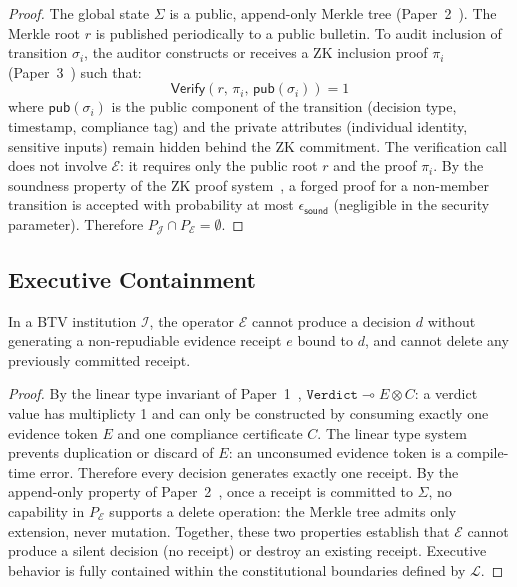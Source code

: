 \begin{proof}
The global state $\Sigma$ is a public, append-only Merkle tree
(Paper~2~\cite{btv-t-repo}). The Merkle root $r$ is published
periodically to a public bulletin. To audit inclusion of transition
$\sigma_i$, the auditor constructs or receives a ZK inclusion proof
$\pi_i$ (Paper~3~\cite{btv-ar2026}) such that:
\[
  \mathsf{Verify}(r,\, \pi_i,\, \mathsf{pub}(\sigma_i)) = 1
\]
where $\mathsf{pub}(\sigma_i)$ is the public component of the transition
(decision type, timestamp, compliance tag) and the private attributes
(individual identity, sensitive inputs) remain hidden behind the ZK
commitment. The verification call does not involve $\mathcal{E}$: it
requires only the public root $r$ and the proof $\pi_i$. By the
soundness property of the ZK proof system~\cite{btv-ar2026}, a forged
proof for a non-member transition is accepted with probability at most
$\epsilon_{\mathsf{sound}}$ (negligible in the security parameter).
Therefore $P_{\mathcal{J}} \cap P_{\mathcal{E}} = \emptyset$.
\end{proof}

\subsection{Executive Containment}
\label{subsec:exec-containment}

\begin{theorem}
\label{thm:exec}
In a BTV institution $\mathcal{I}$, the operator $\mathcal{E}$ cannot
produce a decision $d$ without generating a non-repudiable evidence
receipt $e$ bound to $d$, and cannot delete any previously committed
receipt.
\end{theorem}

\begin{proof}
By the linear type invariant of Paper~1~\cite{btv2026},
$\mathtt{Verdict} \multimap E \otimes C$: a verdict value has
multiplicty 1 and can only be constructed by consuming exactly one
evidence token $E$ and one compliance certificate $C$. The linear
type system prevents duplication or discard of $E$: an unconsumed
evidence token is a compile-time error. Therefore every decision
generates exactly one receipt. By the append-only property of
Paper~2~\cite{btv-t-repo}, once a receipt is committed to $\Sigma$,
no capability in $P_{\mathcal{E}}$ supports a delete operation:
the Merkle tree admits only extension, never mutation. Together, these
two properties establish that $\mathcal{E}$ cannot produce a silent
decision (no receipt) or destroy an existing receipt. Executive
behavior is fully contained within the constitutional boundaries
defined by $\mathcal{L}$.
\end{proof}

